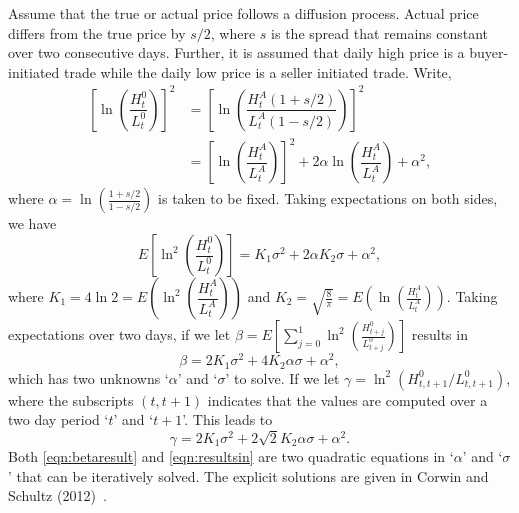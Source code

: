 Assume that the true or actual price follows a diffusion process. Actual price differs from the true price by $s/2$, where $s$ is the spread that remains constant over two consecutive days. Further, it is assumed that daily high price is a buyer-initiated trade while the daily low price is a seller initiated trade. Write,
	\begin{equation} \label{eqn:sellertrade}
	\begin{aligned}
	\left[ \ln \left( \dfrac{H_t^0}{L_t^0} \right) \right]^2&= \left[ \ln \left( \dfrac{H_t^A(1+s/2)}{L_t^A(1-s/2)} \right) \right]^2 \\
	&=\left[ \ln \left( \dfrac{H_t^A}{L_t^A} \right) \right]^2 + 2 \alpha \ln\left( \dfrac{H_t^A}{L_t^A} \right) + \alpha^2,
	\end{aligned}
	\end{equation}
where $\alpha=\ln\left( \frac{1+s/2}{1-s/2} \right)$ is taken to be fixed. Taking expectations on both sides, we have
	\begin{equation} \label{eqn:expsides}
	E\left[ \ln^2 \left( \dfrac{H_t^0}{L_t^0} \right) \right]= K_1\sigma^2 + 2\alpha K_2 \sigma + \alpha^2,
	\end{equation}
where $K_1= 4\ln 2= E\left( \ln^2 \left( \dfrac{H_t^A}{L_t^A} \right) \right)$ and $K_2= \sqrt{\frac{8}{\pi}}= E\left( \ln\left(\frac{H_t^A}{L_t^A} \right) \right)$. Taking expectations over two days, if we let $\beta= E\left[ \sum_{j=0}^1 \ln^2 \left( \frac{H_{t+j}^0}{L_{t+j}^0} \right) \right]$ results in 
	\begin{equation} \label{eqn:betaresult}
	\beta= 2K_1 \sigma^2 + 4K_2 \alpha \sigma + \alpha^2,
	\end{equation}
which has two unknowns `$\alpha$' and `$\sigma$' to solve. If we let $\gamma= \ln^2(H_{t,t+1}^0/L_{t,t+1}^0)$, where the subscripts $(t,t+1)$ indicates that the values are computed over a two day period `$t$' and `$t+1$'. This leads to
	\begin{equation} \label{eqn:resultsin}
	\gamma= 2K_1\sigma^2 + 2\sqrt{2} K_2\alpha \sigma + \alpha^2.
	\end{equation}
Both \eqref{eqn:betaresult} and \eqref{eqn:resultsin} are two quadratic equations in `$\alpha$' and `$\sigma$' that can be iteratively solved. The explicit solutions are given in Corwin and Schultz (2012)~\cite{schultz12}.


